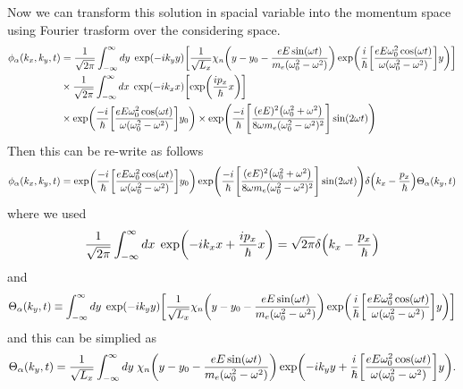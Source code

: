 \vspace{5mm}
\noindent
Now we can transform this solution in spacial variable into the momentum space using Fourier trasform over the considering space.
\begin{equation} \label{3.21}
  \begin{aligned}
    \phi_{\alpha}(k_x,k_y,t)  &=
    \frac{1}{\sqrt{2\pi}}
    \int_{-\infty}^{\infty} dy\; \exp(-ik_y y)
    \qty[
    \frac{1}{\sqrt{L_x}}
    \chi_{n}\qty(y - y_0 - \frac{eE\sin(\omega t)}{m_e(\omega_0^2 - \omega^2)} )
    \exp(
     \frac{i}{\hbar}
     \qty[
     \frac{eE\omega_0^2\cos(\omega t)}{\omega(\omega_0^2 - \omega^2)}]
     y)] \\
     & \times
     \frac{1}{\sqrt{2\pi}}
     \int_{-\infty}^{\infty} dx\; \exp(-ik_x x)
     \qty[
     \exp( \frac{i p_x }{\hbar}x )
     ] \\
     &
     \times
     \exp(
      \frac{-i}{\hbar}
      \qty[
      \frac{eE\omega_0^2\cos(\omega t)}{\omega(\omega_0^2 - \omega^2)}]y_0)
      \times
     \exp(\frac{-i}{\hbar}
     \qty[
     \frac{(eE)^2\qty(\omega_0^2 + \omega^2)}{8\omega m_e(\omega_0^2 - \omega^2)^2}
     ]\sin(2\omega t)
     )
  \end{aligned}
\end{equation}
Then this can be re-write as follows
\begin{equation} \label{3.22}
    \phi_{\alpha}(k_x,k_y,t)  =
    \exp(
     \frac{-i}{\hbar}
     \qty[
     \frac{eE\omega_0^2\cos(\omega t)}{\omega(\omega_0^2 - \omega^2)}]y_0)
    \exp(\frac{-i}{\hbar}
    \qty[
    \frac{(eE)^2\qty(\omega_0^2 + \omega^2)}{8\omega m_e(\omega_0^2 - \omega^2)^2}
    ]\sin(2\omega t))
    \delta\qty(k_x -\frac{p_x}{\hbar})
    \Theta_{\alpha}(k_y,t)
\end{equation}
where we used
\begin{equation} \label{3.23}
  \frac{1}{\sqrt{2\pi}}
  \int_{-\infty}^{\infty} dx\;
  \exp( -ik_x x + \frac{i p_x }{\hbar}x ) =
  \sqrt{2\pi} \delta\qty(k_x -\frac{p_x}{\hbar})
\end{equation}
and
\begin{equation} \label{3.24}
  \Theta_{\alpha}(k_y,t) \equiv
  \int_{-\infty}^{\infty} dy\; \exp(-ik_y y)
  \qty[
  \frac{1}{\sqrt{L_x}}
  \chi_{n}\qty(y -y_0 - \frac{eE\sin(\omega t)}{m_e(\omega_0^2 - \omega^2)} )
  \exp(
   \frac{i}{\hbar}
   \qty[
   \frac{eE\omega_0^2\cos(\omega t)}{\omega(\omega_0^2 - \omega^2)}]
   y)]
\end{equation}
and this can be simplied as
\begin{equation} \label{3.25}
  \Theta_{\alpha}(k_y,t) =
  \frac{1}{\sqrt{L_x}}
  \int_{-\infty}^{\infty} dy\;
  \chi_{n}\qty(y -y_0 - \frac{eE\sin(\omega t)}{m_e(\omega_0^2 - \omega^2)} )
  \exp(
    -ik_y y +
   \frac{i}{\hbar}
   \qty[
   \frac{eE\omega_0^2\cos(\omega t)}{\omega(\omega_0^2 - \omega^2)}] y).
\end{equation}
